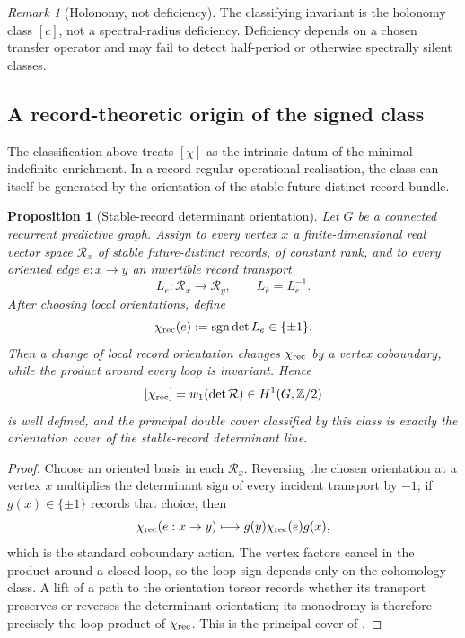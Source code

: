 \documentclass[11pt]{article}
\newtheorem{proposition}[theorem]{Proposition}
\theoremstyle{definition}
\theoremstyle{remark}
\newtheorem{remark}[theorem]{Remark}
\newcommand{\Ztwo}{\mathbb{Z}/2}
\newcommand{\sgn}{\operatorname{sgn}}
\begin{document}
\begin{remark}[Holonomy, not deficiency]
\label{rem:not-deficiency}
The classifying invariant is the holonomy class \([c]\), not a spectral-radius
deficiency.  Deficiency depends on a chosen transfer operator and may fail to
detect half-period or otherwise spectrally silent classes.
\end{remark}


\subsection{A record-theoretic origin of the signed class}
\label{subsec:record-origin-signed-class}

The classification above treats \([\chi]\) as the intrinsic datum of the
minimal indefinite enrichment.  In a record-regular operational realisation,
the class can itself be generated by the orientation of the stable
future-distinct record bundle.

\begin{proposition}[Stable-record determinant orientation]
\label{prop:record-determinant-orientation}
Let \(G\) be a connected recurrent predictive graph.  Assign to every vertex
\(x\) a finite-dimensional real vector space \(\mathcal R_x\) of stable
future-distinct records, of constant rank, and to every oriented edge
\(e:x\to y\) an invertible record transport
\[
   L_e:\mathcal R_x\longrightarrow\mathcal R_y,
   \qquad L_{\bar e}=L_e^{-1}.
\]
After choosing local orientations, define
\[
   \chi_{\rm rec}(e):=\sgn\det L_e\in\{\pm1\}.
\]
Then a change of local record orientation changes \(\chi_{\rm rec}\) by a
vertex coboundary, while the product around every loop is invariant.  Hence
\[
   [\chi_{\rm rec}]
   =w_1(\det\mathcal R)
   \in H^1(G,\Ztwo)
\]
is well defined, and the principal double cover classified by this class is
exactly the orientation cover of the stable-record determinant line.
\end{proposition}

\begin{proof}
Choose an oriented basis in each \(\mathcal R_x\).  Reversing the chosen
orientation at a vertex \(x\) multiplies the determinant sign of every incident
transport by \(-1\); if \(g(x)\in\{\pm1\}\) records that choice, then
\[
   \chi_{\rm rec}(e:x\to y)
   \longmapsto g(y)\chi_{\rm rec}(e)g(x),
\]
which is the standard coboundary action.  The vertex factors cancel in the
product around a closed loop, so the loop sign depends only on the cohomology
class.  A lift of a path to the orientation torsor records whether its
transport preserves or reverses the determinant orientation; its monodromy is
therefore precisely the loop product of \(\chi_{\rm rec}\).  This is the
principal cover of .
\end{proof}
\end{document}
